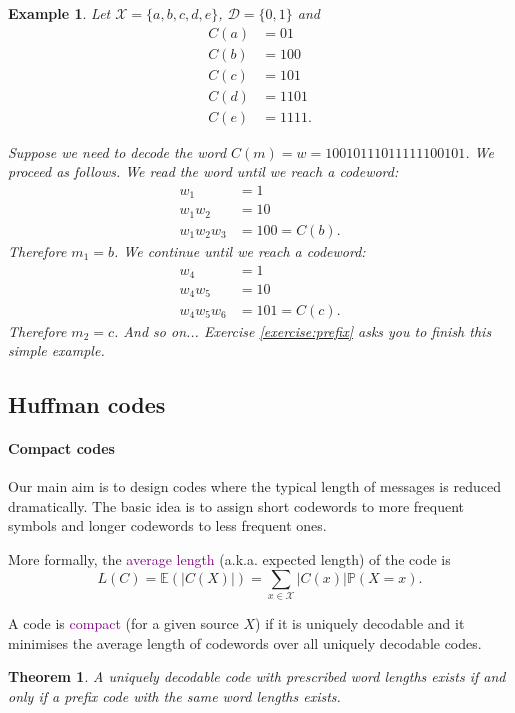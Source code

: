 \documentclass[a4paper, 11pt, openany]{article}
\numberwithin{equation}{section}
\theoremstyle{plain}
\newtheorem{theorem}	[equation]	{Theorem}
\newtheorem{example}	[equation]	{Example}
\theoremstyle{definition}
\newcommand{\probability}{\mathbb{P}}
\newcommand{\expectation}{\mathbb{E}}
\newcommand{\Define}[1]{\textcolor{purple}{#1}}
\begin{document}
\begin{example}
Let $\mathcal{X} = \{a, b, c, d, e\}$, $\mathcal{D} = \{0,1\}$ and 
\begin{align*}
    C(a) &= 01\\
    C(b) &= 100\\
    C(c) &= 101\\
    C(d) &= 1101\\
    C(e) &= 1111.
\end{align*}

Suppose we need to decode the word $C(m) = w = 10010111011111100101$. We proceed as follows. We read the word until we reach a codeword:
\begin{align*}
    w_1 &= 1\\
    w_1 w_2 &= 10\\
    w_1 w_2 w_3 &= 100 = C(b). 
\end{align*}
Therefore $m_1 = b$. We continue until we reach a codeword:
\begin{align*}
    w_4 &= 1\\
    w_4 w_5 &= 10\\
    w_4 w_5 w_6 &= 101 = C(c). 
\end{align*}
Therefore $m_2 = c$. And so on... Exercise \ref{exercise:prefix} asks you to finish this simple example.
\end{example}


\subsection{Huffman codes}


\paragraph{Compact codes}

Our main aim is to design codes where the typical length of messages is reduced dramatically. The basic idea is to assign short codewords to more frequent symbols and longer codewords to less frequent ones.


More formally, the \Define{average length} (a.k.a. expected length) of the code is 
\[
    L(C) = \expectation( |C(X)| ) = \sum_{x \in \mathcal{X}} |C(x)| \probability(X = x).
\]

A code is \Define{compact} (for a given source $X$) if it is uniquely decodable and it minimises the average length of codewords over all uniquely decodable codes.


\begin{theorem}
A uniquely decodable code with prescribed word lengths exists if and only if a prefix code with the same word lengths exists.
\end{theorem}
\end{document}
